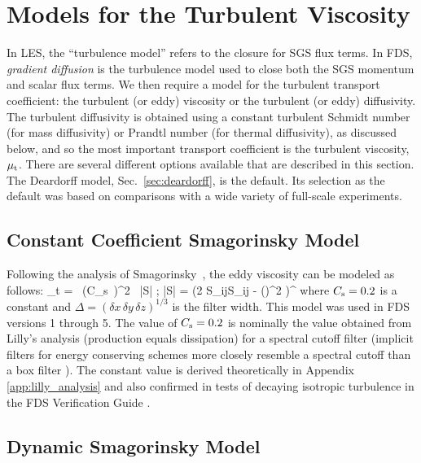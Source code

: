 \newpage
\section{Models for the Turbulent Viscosity}
\label{section:turbulent_viscosity}

In LES, the ``turbulence model'' refers to the closure for SGS flux terms.  In FDS, \emph{gradient diffusion} is the turbulence model used to close both the SGS momentum and scalar flux terms.  We then require a model for the turbulent transport coefficient: the turbulent (or eddy) viscosity or the turbulent (or eddy) diffusivity.  The turbulent diffusivity is obtained using a constant turbulent Schmidt number (for mass diffusivity) or Prandtl number (for thermal diffusivity), as discussed below, and so the most important transport coefficient is the turbulent viscosity, $\mu_{\rm t}$. There are several different options available that are described in this section. The Deardorff model, Sec.~\ref{sec:deardorff}, is the default. Its selection as the default was based on comparisons with a wide variety of full-scale experiments.

\subsection{Constant Coefficient Smagorinsky Model}

Following the analysis of Smagorinsky~\cite{Smagorinsky:1}, the eddy viscosity can be modeled as follows:
\be
\mu_t = \rho \, (C_{\rm s}\, \Delta)^2 \, |S| \label{constant_coef_LES} \quad ; \quad |S| = \left(2 S_{ij}S_{ij} -  (\nabla\!\cdot \bu)^2 \right)^\ha
\ee
where $C_{\rm s}=0.2$ is a constant and $\Delta = (\delta x \, \delta y \, \delta z)^{1/3}$ is the filter width. This model was used in FDS versions 1 through 5.  The value of $C_{\rm s}=0.2$ is nominally the value obtained from Lilly's analysis \cite{Lilly:1967} (production equals dissipation) for a spectral cutoff filter (implicit filters for energy conserving schemes more closely resemble a spectral cutoff than a box filter \cite{McDermott:2005b}).  The constant value is derived theoretically in Appendix \ref{app:lilly_analysis} and also confirmed in tests of decaying isotropic turbulence in the FDS Verification Guide \cite{FDS_Verification_Guide}.

\subsection{Dynamic Smagorinsky Model}

